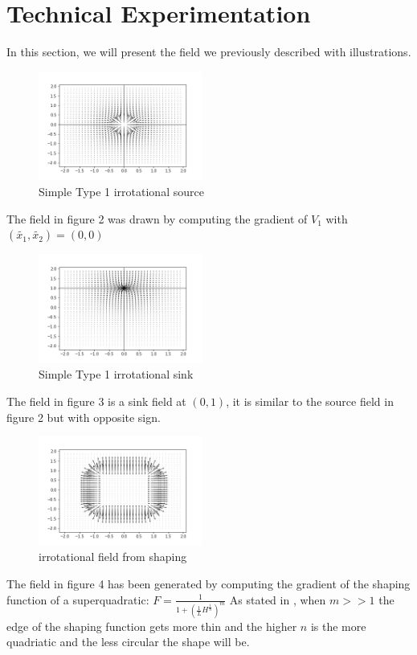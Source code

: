 \section{Technical Experimentation}
In this section, we will present the field we previously described with illustrations. 
\begin{figure}[h!]
    \centering
    \includegraphics[width=0.48\textwidth]{Images/simplesource.png}
    \caption{Simple Type 1 irrotational source}
    \label{fig:simplesource}
\end{figure}
The field in figure 2 was drawn by computing the gradient of $V_1$ with $(\tilde{{x}_{1}}, \tilde{{x}_{2}}) = (0,0)$ 

\begin{figure}[h!]
    \centering
    \includegraphics[width=0.48\textwidth]{Images/simplesink01.png}
    \caption{Simple Type 1 irrotational sink}
    \label{fig:simplesink}
\end{figure}
The field in figure 3 is a sink field at $(0,1)$, it is similar to the source field in figure 2 but with opposite sign.

\begin{figure}[h!]
    \centering
    \includegraphics[width=0.48\textwidth]{Images/irrotafromshaping.png}
    \caption{irrotational field from shaping}
    \label{fig:irrotafromshaping}
\end{figure}
The field in figure 4 has been generated by computing the gradient of the shaping function of a superquadratic: 
$F=\frac{1}{1+(\frac{1}{L}H^{\frac{1}{n}})^m}$
As stated in \cite{mcinnes2003velocity}, when $m>>1$ the edge of the shaping function gets more thin and the higher $n$ is the more quadriatic and the less circular the shape will be.

